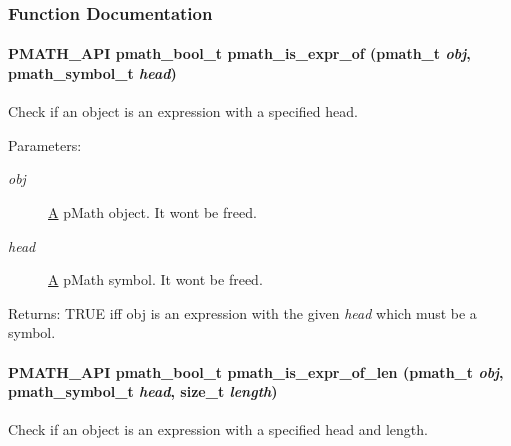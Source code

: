 \subsubsection{Function Documentation}
\hypertarget{group__helpers_g66eb580a000ee1d778b43dec124f170d}{
\paragraph[{pmath\_\-is\_\-expr\_\-of}]{\setlength{\rightskip}{0pt plus 5cm}PMATH\_\-API {\bf pmath\_\-bool\_\-t} pmath\_\-is\_\-expr\_\-of ({\bf pmath\_\-t} {\em obj}, \/  {\bf pmath\_\-symbol\_\-t} {\em head})}\hfill}
\label{group__helpers_g66eb580a000ee1d778b43dec124f170d}


Check if an object is an expression with a specified head. 

\begin{Desc}
\item[Parameters:]
\begin{description}
\item[{\em obj}]\hyperlink{class_a}{A} pMath object. It wont be freed. \item[{\em head}]\hyperlink{class_a}{A} pMath symbol. It wont be freed. \end{description}
\end{Desc}
\begin{Desc}
\item[Returns:]TRUE iff obj is an expression with the given {\em head\/} which must be a symbol. \end{Desc}
\hypertarget{group__helpers_g68d264fe6b3db0931b4d0a8d5c7427f5}{
\paragraph[{pmath\_\-is\_\-expr\_\-of\_\-len}]{\setlength{\rightskip}{0pt plus 5cm}PMATH\_\-API {\bf pmath\_\-bool\_\-t} pmath\_\-is\_\-expr\_\-of\_\-len ({\bf pmath\_\-t} {\em obj}, \/  {\bf pmath\_\-symbol\_\-t} {\em head}, \/  size\_\-t {\em length})}\hfill}
\label{group__helpers_g68d264fe6b3db0931b4d0a8d5c7427f5}


Check if an object is an expression with a specified head and length. 

